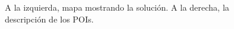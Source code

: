 \vspace{0.06in}
\begin{figure}
	\centering
	\caption{A la izquierda, mapa mostrando la solución. A la derecha, la descripción de los POIs.}
	\label{fig:result_activity}
\end{figure}
